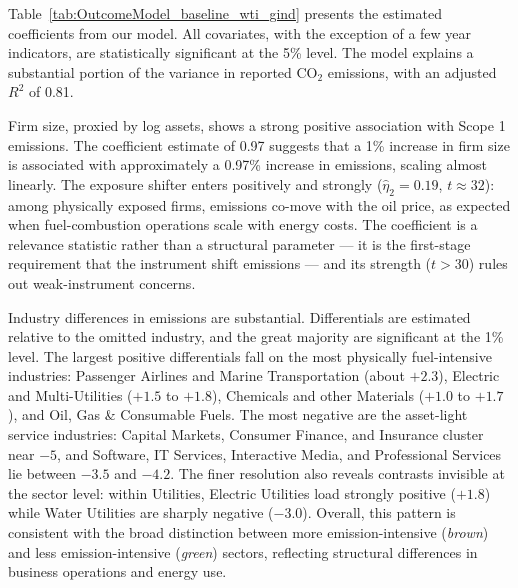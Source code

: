 \documentclass[a4paper,12pt]{article}
\begin{document}
Table~\ref{tab:OutcomeModel_baseline_wti_gind} presents the estimated coefficients from our model. All covariates, with the exception of a few year indicators, are statistically significant at the 5\% level. The model explains a substantial portion of the variance in reported CO$_2$ emissions, with an adjusted $R^2$ of 0.81. 

Firm size, proxied by log assets, shows a strong positive association with Scope 1 emissions. The coefficient estimate of 0.97 suggests that a 1\% increase in firm size is associated with approximately a 0.97\% increase in emissions, scaling almost linearly. The exposure shifter enters positively and strongly ($\hat\eta_2 = 0.19$, $t\approx 32$): among physically exposed firms, emissions co-move with the oil price, as expected when fuel-combustion operations scale with energy costs. The coefficient is a relevance statistic rather than a structural parameter — it is the first-stage requirement that the instrument shift emissions — and its strength ($t>30$) rules out weak-instrument concerns.
    
Industry differences in emissions are substantial. Differentials are estimated relative to the omitted industry, and the great majority are significant at the 1\% level. The largest positive differentials fall on the most physically fuel-intensive industries: Passenger Airlines and Marine Transportation (about $+2.3$), Electric and Multi-Utilities ($+1.5$ to $+1.8$), Chemicals and other Materials ($+1.0$ to $+1.7$), and Oil, Gas \& Consumable Fuels. The most negative are the asset-light service industries: Capital Markets, Consumer Finance, and Insurance cluster near $-5$, and Software, IT Services, Interactive Media, and Professional Services lie between $-3.5$ and $-4.2$. The finer resolution also reveals contrasts invisible at the sector level: within Utilities, Electric Utilities load strongly positive ($+1.8$) while Water Utilities are sharply negative ($-3.0$). Overall, this pattern is consistent with the broad distinction between more emission-intensive (\textit{brown}) and less emission-intensive (\textit{green}) sectors, reflecting structural differences in business operations and energy use.
\end{document}
